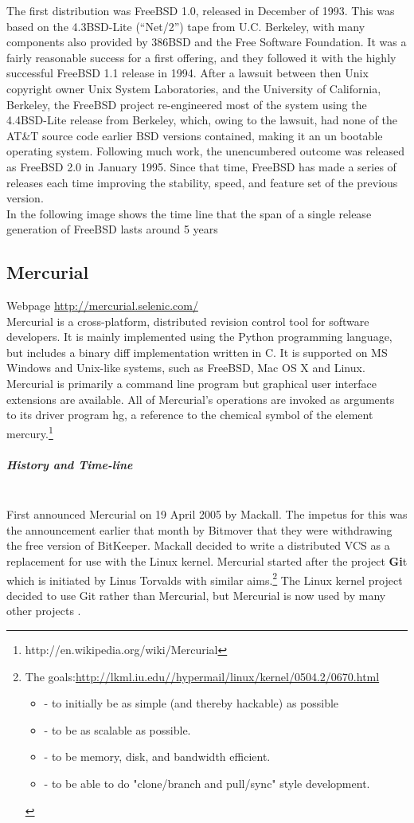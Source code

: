 \documentclass[11pt]{article} %
\begin{document}
The first distribution was FreeBSD 1.0, released in December of 1993. This was based on the 4.3BSD-Lite (“Net/2”) tape from U.C. Berkeley, with many components also provided by 386BSD and the Free Software Foundation. It was a fairly reasonable success for a first offering, and they followed it with the highly successful FreeBSD 1.1 release in 1994.
 After a lawsuit between then Unix copyright owner Unix System Laboratories, and the University of California, Berkeley, the FreeBSD project re-engineered most of the system using the 4.4BSD-Lite release from Berkeley, which, owing to the lawsuit, had none of the AT\&T source code earlier BSD versions contained, making it an un bootable operating system. Following much work, the unencumbered outcome was released as FreeBSD 2.0 in January 1995.
Since that time, FreeBSD has made a series of releases each time improving the stability, speed, and feature set of the previous version.\\
In the following image shows the time line that the span of a single release generation of FreeBSD lasts around 5 years
\pagebreak


\subsection{Mercurial}
Webpage \url{http://mercurial.selenic.com/}\\
Mercurial is a cross-platform, distributed revision control tool for software developers. It is mainly implemented using the Python programming language, but includes a binary diff implementation written in C. It is supported on MS Windows and Unix-like systems, such as FreeBSD, Mac OS X and Linux. Mercurial is primarily a command line program but graphical user interface extensions are available. All of Mercurial's operations are invoked as arguments to its driver program hg, a reference to the chemical symbol of the element mercury.\footnote{http://en.wikipedia.org/wiki/Mercurial}

  \subparagraph{History and Time-line} \mbox{} \\
    First announced Mercurial on 19 April 2005 by Mackall. The impetus for this was the announcement earlier that month by Bitmover that they were withdrawing the free version of BitKeeper. Mackall decided to write a distributed VCS as a replacement for use with the Linux kernel.
Mercurial started after the project {\bf Gi}t which is initiated by Linus Torvalds with similar aims.\footnote{ The goals:\url{http://lkml.iu.edu//hypermail/linux/kernel/0504.2/0670.html}
\begin{itemize}
\item - to initially be as simple (and thereby hackable) as possible

\item- to be as scalable as possible.

\item- to be memory, disk, and bandwidth efficient.

\item- to be able to do "clone/branch and pull/sync" style development. \end{itemize}
}
The Linux kernel project decided to use Git rather than Mercurial, but Mercurial is now used by many other projects .
\end{document}
